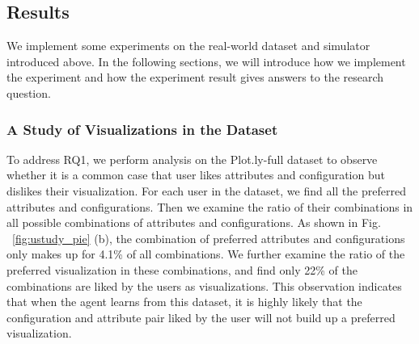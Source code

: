 \subsection{Results}

We implement some experiments on the real-world dataset and simulator introduced above. In the following sections, we will introduce how we implement the experiment and how the experiment result gives answers to the research question.

\subsubsection{A Study of Visualizations in the Dataset}
To address RQ1, we perform analysis on the Plot.ly-full dataset to observe whether it is a common case that user likes attributes and configuration but dislikes their visualization. For each user in the dataset, we find all the preferred attributes and configurations. Then we examine the ratio of their combinations in all possible combinations of attributes and configurations. As shown in Fig. ~\ref{fig:ustudy_pie} (b), the combination of preferred attributes and configurations only makes up for 4.1\% of all combinations. 
We further examine the ratio of the preferred visualization in these combinations, and find only 22\% of the combinations are liked by the users as visualizations. This observation indicates that when the agent learns from this dataset, it is highly likely that the configuration and attribute pair liked by the user will not build up a preferred visualization. 


